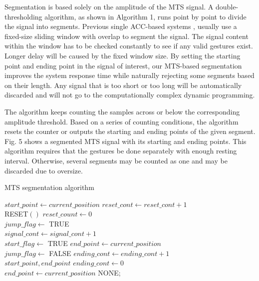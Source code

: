 Segmentation is based solely on the amplitude of the MTS
signal. A double-thresholding algorithm, as shown in Algorithm
1, runs point by point to divide the signal into segments.
Previous single ACC-based systems \cite{c13}, \cite{c14} usually use a
fixed-size sliding window with overlap to segment the signal.
The signal content within the window has to be checked
constantly to see if any valid gestures exist. Longer delay will
be caused by the fixed window size. By setting the starting
point and ending point in the signal of interest, our MTS-based
segmentation improves the system response time while
naturally rejecting some segments based on their length. Any
signal that is too short or too long will be automatically
discarded and will not go to the computationally complex
dynamic programming.

The algorithm keeps counting the samples across or below
the corresponding amplitude threshold. Based on a series of
counting conditions, the algorithm resets the counter or outputs
the starting and ending points of the given segment. Fig. 5
shows a segmented MTS signal with its starting and ending
points. This algorithm requires that the gestures be done
separately with enough resting interval. Otherwise, several
segments may be counted as one and may be discarded due to
oversize.

\begin{tiny}
\begin{algorithm}
  \caption{MTS segmentation algorithm}
  \scriptsize
  {
    {
      $start\_point\leftarrow current\_position$
    }{
      $reset\_cont\leftarrow reset\_cont + 1$ \\
      {
        RESET$()$      
      }
    }
  }
  {
    $reset\_count\leftarrow 0$ \\
    $jump\_flag\leftarrow$ TRUE \\
    $signal\_cont\leftarrow signal\_cont + 1$ \\
     {
        $start\_flag\leftarrow$ TRUE      
     }
  }
  {
     {
        $end\_point\leftarrow current\_position$ \\
        $jump\_flag\leftarrow$ FALSE
     }
     $ending\_cont\leftarrow ending\_cont + 1$ \\
     {
        \Return $start\_point, end\_point$
     }
  }
  {
     {
        $ending\_cont\leftarrow 0$ \\
        $end\_point\leftarrow current\_position$
     }
  }
  \Return NONE;
\end{algorithm}
\end{tiny}

